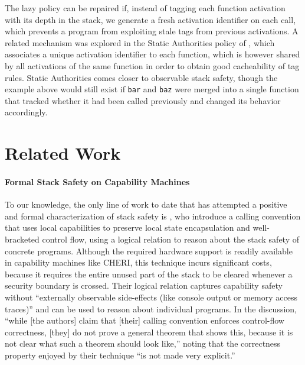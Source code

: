 \documentclass[acmsmall,review,anonymous]{acmart}\settopmatter{printfolios=true,printccs=false,printacmref=false}
\begin{document}
    The lazy policy can be repaired if, instead of tagging each function
    activation with its depth in the stack, we generate a fresh activation
    identifier on each call, which prevents a program from exploiting stale
    tags from previous activations. A related mechanism was explored in the
    Static Authorities policy of \citet{DBLP:conf/sp/RoesslerD18}, which
    associates a unique activation identifier to each function, which is
    however shared by all activations of the same function in order to obtain
    good cacheability of tag rules. Static Authorities comes closer to
    observable stack safety, though the example above would still exist
    if {\tt bar} and {\tt baz} were merged into a single function that tracked
    whether it had been called previously and changed its behavior accordingly.
    \ifaftersubmission{}\fi

\section{Related Work}
\label{sec:relwork}


\paragraph{Formal Stack Safety on Capability Machines}
%
To our knowledge, the only line of work to date that has attempted
a positive and formal characterization of
stack safety is \citet{Skorstengaard+19b}, who introduce a calling
convention that uses local capabilities to preserve local state
encapsulation and well-bracketed control flow, using a logical
relation to reason about the stack safety of concrete
programs. Although the required hardware support is readily available
in capability machines like CHERI, this technique incurs significant
costs, because it requires the entire unused part of the stack to be
cleared whenever a security boundary is crossed. Their logical
relation captures capability safety without ``externally observable
side-effects (like console output or memory access traces)''
and can be used to reason about individual programs. In the
discussion, ``while [the authors] claim that [their] calling
convention enforces control-flow correctness, [they] do not prove a
general theorem that shows this, because it is not clear what such a
theorem should look like,'' noting that the correctness property
enjoyed by their technique ``is not made very explicit.''
\end{document}
